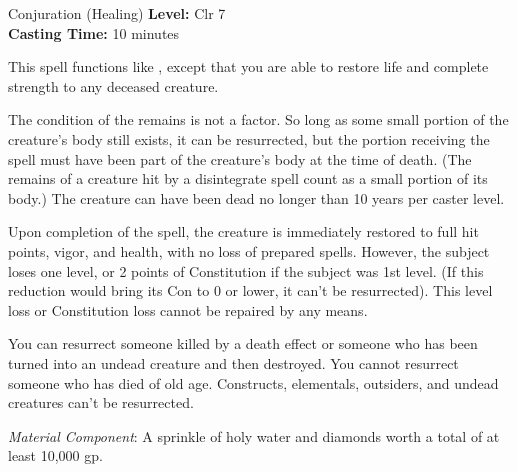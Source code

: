 {Conjuration (Healing)}
{
	\textbf{Level:}
	Clr 7\\
	\textbf{Casting Time:}
	10 minutes\\
}
{
	This spell functions like , except that you are able to restore life and complete strength to any deceased creature.

	The condition of the remains is not a factor. So long as some small portion of the creature's body still exists, it can be resurrected, but the portion receiving the spell must have been part of the creature's body at the time of death. (The remains of a creature hit by a disintegrate spell count as a small portion of its body.) The creature can have been dead no longer than 10 years per caster level.

	Upon completion of the spell, the creature is immediately restored to full hit points, vigor, and health, with no loss of prepared spells. However, the subject loses one level, or 2 points of Constitution if the subject was 1st level. (If this reduction would bring its Con to 0 or lower, it can't be resurrected). This level loss or Constitution loss cannot be repaired by any means.

	You can resurrect someone killed by a death effect or someone who has been turned into an undead creature and then destroyed. You cannot resurrect someone who has died of old age. Constructs, elementals, outsiders, and undead creatures can't be resurrected.

	\textit{Material Component}:
	A sprinkle of holy water and diamonds worth a total of at least 10,000 gp.

}
